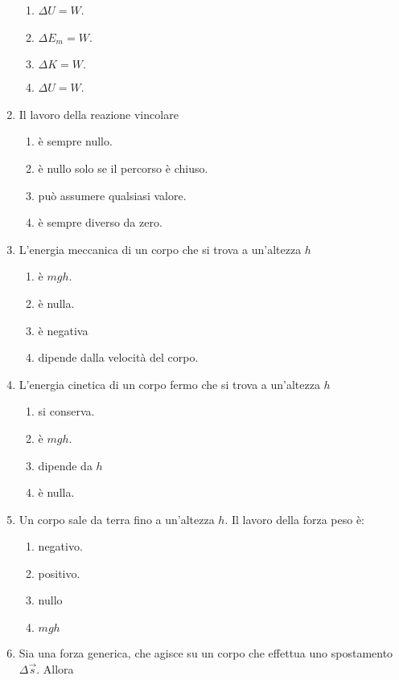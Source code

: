 \documentclass{article}
\begin{document}
\begin{enumerate}
  \begin{enumerate}[label=\Alph*.]
    \item $\Delta U=W$.
    \item $\Delta E_m=W$.
    \item $\Delta K=W.$
    \item $\Delta U=W$.
  \end{enumerate}
  \item Il lavoro della reazione vincolare
  \begin{enumerate}[label=\Alph*.]
    \item è sempre nullo.
    \item è nullo solo se il percorso è chiuso.
    \item può assumere qualsiasi valore.
    \item è sempre diverso da zero.
  \end{enumerate}
  \item L'energia meccanica di un corpo che si trova a un'altezza $h$
  \begin{enumerate}[label=\Alph*.]
    \item è $mgh$.
    \item è nulla.
    \item è negativa
    \item dipende dalla velocità del corpo.
  \end{enumerate}
  \item L'energia cinetica di un corpo fermo che si trova a un'altezza $h$
  \begin{enumerate}[label=\Alph*.]
    \item si conserva.
    \item è $mgh$.
    \item dipende da $h$
    \item è nulla.
  \end{enumerate}
  \item Un corpo sale da terra fino a un'altezza $h$. Il lavoro della forza peso è:
  \begin{enumerate}[label=\Alph*.]
    \item negativo.
    \item positivo.
    \item nullo
    \item $mgh$
  \end{enumerate}
  \item Sia  una forza generica, che agisce su un corpo che effettua uno spostamento $\Delta \vec{s}$. Allora
  \begin{enumerate}[label=\Alph*.]

\end{enumerate}
\end{enumerate}
\end{document}
